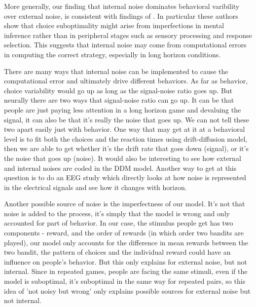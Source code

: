 \documentclass[12pt]{article}
\begin{document}
	More generally, our finding that internal noise dominates behavioral varibility over external noise, is consistent with findings of \cite{drugowitsch16}. In particular these authors show that choice suboptimality might arise from imperfections in mental inference rather than in peripheral stages such as sensory processing and response selection. This suggests that internal noise may come from computational errors in computing the correct strategy, especially in long horizon conditions.
	
	
	There are many ways that internal noise can be implemented to cause the computational error and ultimately drive different behaviors. As far as behavior, choice variability would go up as long as the signal-noise ratio goes up. But neurally there are two ways that signal-noise ratio can go up. It can be that people are just paying less attention in a long horizon game and devaluing the signal, it can also be that it's really the noise that goes up. We can not tell these two apart easily just with behavior. One way that may get at it at a behavioral level is to fit both the choices and the reaction times using drift-diffusion model, then we are able to get whether it's the drift rate that goes down (signal), or it's the noise that goes up (noise). It would also be interesting to see how external and internal noises are coded in the DDM model. Another way to get at this question is to do an EEG study which directly looks at how noise is represented in the electrical signals and see how it changes with horizon.
	
	Another possible source of noise is the imperfectness of our model. It's not that noise is added to the process, it's simply that the model is wrong and only accounted for part of behavior. In our case, the stimulus people get has two components - reward, and the order of rewards (in which order two bandits are played), our model only accounts for the difference in mean rewards between the two bandit, the pattern of choices and the individual reward could have an influence on people's behavior. But this only explains for external noise, but not internal. Since in repeated games, people are facing the same stimuli, even if the model is suboptimal, it's suboptimal in the same way for repeated pairs, so this idea of 'not noisy but wrong' only explains possible sources for external noise but not internal. 
	
\end{document}
